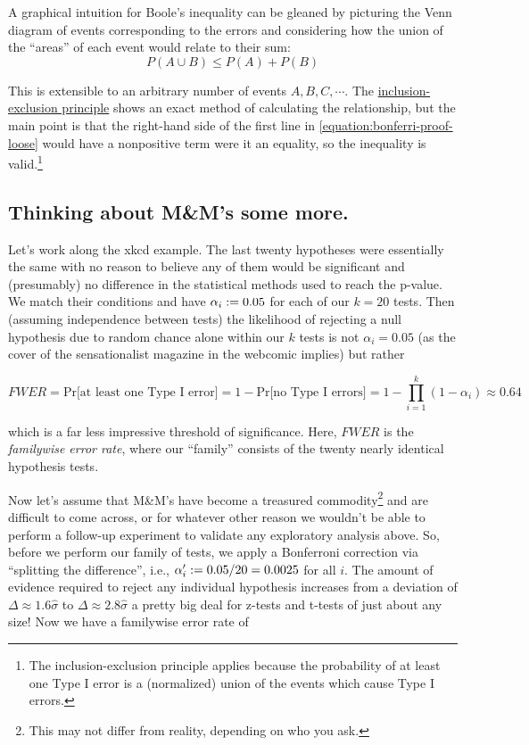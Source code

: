 \documentclass[../main/main.tex]{subfiles}
\begin{document}
A graphical intuition for Boole's inequality can be gleaned by
picturing the Venn diagram of events corresponding to
the errors and considering how the union of the ``areas''
of each event would relate to their sum:
\[P(A \cup B) \leq P(A) + P(B) \]

This is extensible to an arbitrary number of events
\(A, B, C, \cdots\).
The 
\href{https://en.wikipedia.org/wiki/Inclusion–exclusion_principle}{inclusion-exclusion principle}
shows an exact method of calculating the relationship,
but the main point is that the right-hand side of
the first line in
\ref{equation:bonferri-proof-loose} would have a nonpositive
term were it an equality, so the inequality is valid.\footnote
{
  The inclusion-exclusion principle applies because 
  the probability of at least one Type I error is a
  (normalized) union of the events which cause Type I errors.
}
\subsection{Thinking about M\&M's some more.}

Let's work along the xkcd example.
The last twenty hypotheses were essentially the same
with no reason
to believe any of them would be significant
and (presumably) no difference in the statistical methods
used to reach the p-value.
We match their conditions and have \(\alpha_i := 0.05\)
for each of our \(k=20\) tests.
Then (assuming independence between tests) the likelihood of 
rejecting a null hypothesis due to random chance alone within our \(k\) tests
is not \(\alpha_i = 0.05\) 
(as the cover of the sensationalist magazine in the webcomic implies)
but rather

\[
  FWER = \text{Pr[at least one Type I error]} = 
  1 - \text{Pr[no Type I errors]} = 1 - \prod_{i=1}^{k} (1 - \alpha_i) \approx 0.64 
\]

which is a far less impressive threshold of significance.
Here, \(FWER\) is the \emph{familywise error rate}, where
our ``family'' consists of the twenty nearly identical
hypothesis tests.\par

Now let's assume that M\&M's have become
a treasured commodity\footnote
{
  This may not differ from reality, depending on who you ask.
} and are difficult to come across,
or for whatever other reason we wouldn't be able to
perform a follow-up experiment to validate any
exploratory analysis above. 
So, before we perform our family of tests,
we apply a Bonferroni correction via
``splitting the difference'', i.e.,
\(\alpha_i' := 0.05/20 = 0.0025\) for all \(i\).
The amount of evidence required to reject any individual
hypothesis increases from a deviation of 
\(\Delta \approx 1.6\hat{\sigma}\) to 
\(\Delta \approx 2.8\hat{\sigma}\)
\textemdash{} a pretty big deal for z-tests and t-tests
of just about any size! Now we have a familywise error rate of
\end{document}
